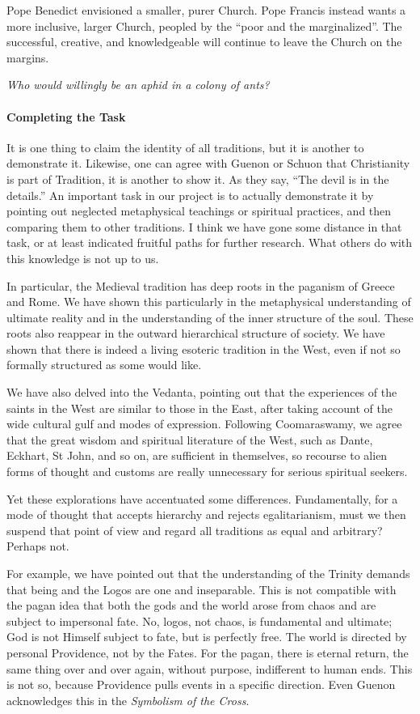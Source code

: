 Pope Benedict envisioned a smaller, purer Church. Pope Francis instead wants a more inclusive, larger Church, peopled by the ``poor and the marginalized''. The successful, creative, and knowledgeable will continue to leave the Church on the margins.

\emph{Who would willingly be an aphid in a colony of ants?}


\paragraph{Completing the Task}


It is one thing to claim the identity of all traditions, but it is another to demonstrate it. Likewise, one can agree with Guenon or Schuon that Christianity is part of Tradition, it is another to show it. As they say, ``The devil is in the details.'' An important task in our project is to actually demonstrate it by pointing out neglected metaphysical teachings or spiritual practices, and then comparing them to other traditions. I think we have gone some distance in that task, or at least indicated fruitful paths for further research. What others do with this knowledge is not up to us.

In particular, the Medieval tradition has deep roots in the paganism of Greece and Rome. We have shown this particularly in the metaphysical understanding of ultimate reality and in the understanding of the inner structure of the soul. These roots also reappear in the outward hierarchical structure of society. We have shown that there is indeed a living esoteric tradition in the West, even if not so formally structured as some would like.

We have also delved into the Vedanta, pointing out that the experiences of the saints in the West are similar to those in the East, after taking account of the wide cultural gulf and modes of expression. Following Coomaraswamy, we agree that the great wisdom and spiritual literature of the West, such as Dante, Eckhart, St John, and so on, are sufficient in themselves, so recourse to alien forms of thought and customs are really unnecessary for serious spiritual seekers.

Yet these explorations have accentuated some differences. Fundamentally, for a mode of thought that accepts hierarchy and rejects egalitarianism, must we then suspend that point of view and regard all traditions as equal and arbitrary? Perhaps not.

For example, we have pointed out that the understanding of the Trinity demands that being and the Logos are one and inseparable. This is not compatible with the pagan idea that both the gods and the world arose from chaos and are subject to impersonal fate. No, logos, not chaos, is fundamental and ultimate; God is not Himself subject to fate, but is perfectly free. The world is directed by personal Providence, not by the Fates. For the pagan, there is eternal return, the same thing over and over again, without purpose, indifferent to human ends. This is not so, because Providence pulls events in a specific direction. Even Guenon acknowledges this in the \emph{Symbolism of the Cross}.

